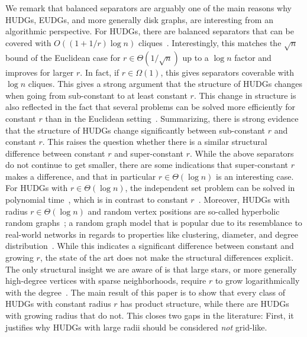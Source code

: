 We remark that balanced separators are arguably one of the main reasons why HUDGs, EUDGs, and more generally disk graphs, are interesting from an algorithmic perspective.
For HUDGs, there are balanced separators that can be covered with $ O((1 + 1/r) \log n) $ cliques~\cite{Struc_Indep_Hyper_Unifor_Disk_Graph-Blaesius25}.
Interestingly, this matches the $\sqrt{n}$ bound of the Euclidean case for $r \in \Theta(1/\sqrt{n})$ up to a $\log n$ factor and improves for larger $r$.
In fact, if $r \in \Omega(1)$, this gives separators coverable with $\log n$ cliques.
This gives a strong argument that the structure of HUDGs changes when going from sub-constant to at least constant $r$.
This change in structure is also reflected in the fact that several problems can be solved more efficiently for constant $r$ than in the Euclidean setting~\cite{kisfaludi_hyperbolic_2019,Struc_Indep_Hyper_Unifor_Disk_Graph-Blaesius25}.
Summarizing, there is strong evidence that the structure of HUDGs change significantly between sub-constant $r$ and constant $r$.
%
This raises the question whether there is a similar structural difference between constant $r$ and super-constant $r$.
While the above separators do not continue to get smaller, there are some indications that super-constant $r$ makes a difference, and that in particular $r \in \Theta(\log n)$ is an interesting case.
For HUDGs with $r \in \Theta(\log n)$, the independent set problem can be solved in polynomial time~\cite{Struc_Indep_Hyper_Unifor_Disk_Graph-Blaesius25}, which is in contrast to constant $r$~\cite{kisfaludi_hyperbolic_2019}.
Moreover, HUDGs with radius $r \in \Theta(\log n)$ and random vertex positions are so-called hyperbolic random graphs~\cite{krioukov_hyperbolic_2010}; a random graph model that is popular due to its resemblance to real-world networks in regards to properties like clustering, diameter, and degree distribution~\cite{friedrich_diameter_2018,friedrich_diameter_2018_conf,Random_Hyper_Graph-Gugel12}.
While this indicates a significant difference between constant and growing $r$, the state of the art does not make the structural differences explicit.
The only structural insight we are aware of is that large stars, or more generally high-degree vertices with sparse neighborhoods, require $r$ to grow logarithmically with the degree~\cite{blasius_strongly_2023}.
%
The main result of this paper is to show that every class of HUDGs with constant radius $r$ has product structure, while there are HUDGs with growing radius that do not.
This closes two gaps in the literature: First, it justifies why HUDGs with large radii should be considered \emph{not} grid-like.
